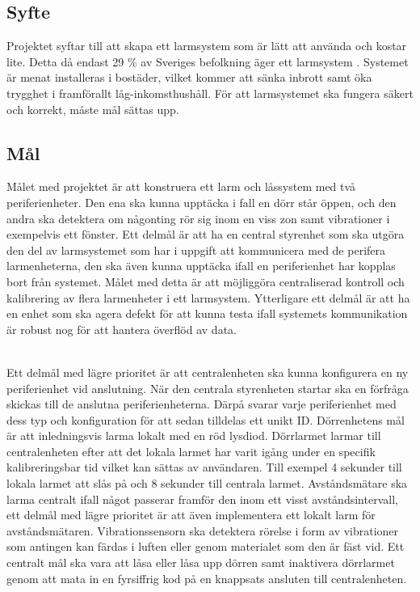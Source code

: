 \documentclass{article}
\begin{document}

\subsection{Syfte}
Projektet syftar till att skapa ett larmsystem som är lätt att använda och kostar lite.
Detta då endast 29 \% av Sveriges befolkning äger ett larmsystem \cite{SSF}.
Systemet är menat installeras i bostäder, vilket kommer att sänka inbrott samt öka trygghet i framförallt låg-inkomsthushåll.
För att larmsystemet ska fungera säkert och korrekt, måste mål sättas upp. 


\subsection{Mål}
Målet med projektet är att konstruera ett larm och låssystem med två periferienheter.
Den ena ska kunna upptäcka i fall en dörr står öppen, och den andra ska detektera om någonting rör sig inom en viss zon samt vibrationer i exempelvis ett fönster. 
Ett delmål är att ha en central styrenhet som ska utgöra den del av larmsystemet som har i uppgift att kommunicera med de perifera larmenheterna, den ska även kunna upptäcka ifall en periferienhet har kopplas bort från systemet.
Målet med detta är att möjliggöra centraliserad kontroll och kalibrering av flera larmenheter i ett larmsystem.
Ytterligare ett delmål är att ha en enhet som ska agera defekt för att kunna testa ifall systemets kommunikation är robust nog för att hantera överflöd av data.

\noindent
\\
Ett delmål med lägre prioritet är att centralenheten ska kunna konfigurera en ny periferienhet vid anslutning. När den centrala styrenheten startar ska en förfråga skickas till de anslutna periferienheterna. 
Därpå svarar varje periferienhet med dess typ och konfiguration för att sedan tilldelas ett unikt ID. 
Dörrenhetens mål är att inledningsvis larma lokalt med en röd lysdiod. 
Dörrlarmet larmar till centralenheten efter att det lokala larmet har varit igång under en specifik kalibreringsbar tid vilket kan sättas av användaren. Till exempel 4 sekunder till lokala larmet att slås på och 8 sekunder till centrala larmet.
Avståndsmätare ska larma centralt ifall något passerar framför den inom ett visst avståndsintervall, ett delmål med lägre prioritet är att även implementera ett lokalt larm för avståndsmätaren.
Vibrationssensorn ska detektera rörelse i form av vibrationer som antingen kan färdas i luften eller genom materialet som den är fäst vid. 
Ett centralt mål ska vara att låsa eller låsa upp dörren samt inaktivera dörrlarmet genom att mata in en fyrsiffrig kod på en knappsats ansluten till centralenheten.
\end{document}
